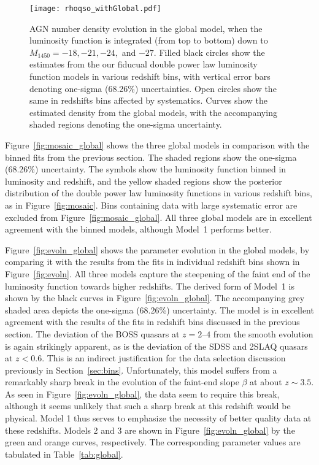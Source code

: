 \documentclass[fleqn,usenatbib]{mnras}
\begin{document}
\begin{figure}
  \begin{center}
    \texttt{[image: rhoqso\_withGlobal.pdf]}
  \end{center}
  \caption{AGN number density evolution in the global model, when the
    luminosity function is integrated (from top to bottom) down to
    $M_\mathrm{1450}=-18, -21, -24,$ and $-27$.  Filled black circles
    show the estimates from the our fiducual double power law
    luminosity function models in various redshift bins, with vertical
    error bars denoting one-sigma (68.26\%) uncertainties.  Open
    circles show the same in redshifts bins affected by systematics.
    Curves show the estimated density from the global models, with the
    accompanying shaded regions denoting the one-sigma uncertainty. }
  \label{fig:rhoqso}
\end{figure}

Figure~\ref{fig:mosaic_global} shows the three global models in
comparison with the binned fits from the previous section.  The shaded
regions show the one-sigma (68.26\%) uncertainty.  The symbols show
the luminosity function binned in luminosity and redshift, and the
yellow shaded regions show the posterior distribution of the double
power law luminosity functions in various redshift bins, as in
Figure~\ref{fig:mosaic}.  Bins containing data with large systematic
error are excluded from Figure~\ref{fig:mosaic_global}.  All three
global models are in excellent agreement with the binned models,
although Model~1 performs better.

Figure~\ref{fig:evoln_global} shows the parameter evolution in the
global models, by comparing it with the results from the fits in
individual redshift bins shown in Figure~\ref{fig:evoln}.  All three
models capture the steepening of the faint end of the luminosity
function towards higher redshifts.  The derived form of Model~1 is
shown by the black curves in Figure~\ref{fig:evoln_global}.  The
accompanying grey shaded area depicts the one-sigma (68.26\%)
uncertainty.  The model is in excellent agreement with the results of
the fits in redshift bins discussed in the previous section.
The deviation of the BOSS quasars at $z=2$--$4$ from the smooth
evolution is again strikingly apparent, as is the deviation of the
SDSS and 2SLAQ quasars at $z<0.6$.  This is an indirect justification
for the data selection discussion previously in
Section~\ref{sec:bins}.  Unfortunately, this model suffers from a
remarkably sharp break in the evolution of the faint-end slope $\beta$
at about $z\sim 3.5$.  As seen in Figure~\ref{fig:evoln_global}, the
data seem to require this break, although it seems unlikely that such
a sharp break at this redshift would be physical.  Model 1 thus serves
to emphasize the necessity of better quality data at these redshifts.
Models 2 and 3 are shown in Figure~\ref{fig:evoln_global} by the green
and orange curves, respectively.  The corresponding parameter values
are tabulated in Table~\ref{tab:global}.
\end{document}

